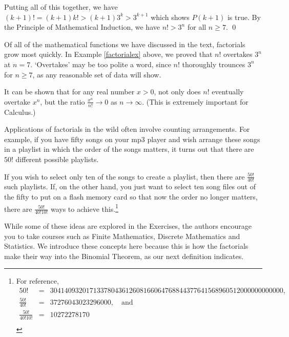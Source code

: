 \documentclass{ximera}
\begin{document}
\begin{example}
\begin{enumerate}
 

Putting all of this together, we have $(k+1)! = (k+1) k! > (k+1)3^{k} > 3^{k+1}$ which shows $P(k+1)$ is true.  By the Principle of Mathematical Induction, we have $n! > 3^{n}$ for all $n \geq 7$. \qed

\end{enumerate}

\end{example} 

Of all of the mathematical functions we have discussed in the text, factorials grow most quickly.  In  Example \ref{factorialex} above, we proved that $n!$ overtakes $3^{n}$ at $n=7$.  `Overtakes' may be too polite a word, since $n!$ thoroughly trounces $3^n$ for $n \geq 7$, as any reasonable set of data will show. 

 

It can be shown that for any real number $x > 0$, not only does $n!$ eventually overtake $x^n$, but the ratio $\frac{x^n}{n!} \rightarrow 0$ as $n \rightarrow \infty$. (This is extremely important for Calculus.)

 

Applications of factorials in the wild often involve counting arrangements. For example, if you have fifty songs on your mp3 player and wish arrange these songs in a playlist in which the order of the songs matters, it turns out that there are $50!$ different possible playlists. 

 

If you wish to select only ten of the songs to create a playlist, then there are $\frac{50!}{40!}$ such playlists.  If, on the other hand, you just want to select ten song files out of the fifty to put on a flash memory card so that now the order no longer matters, there are $\frac{50!}{40! 10!}$ ways to achieve this.\footnote{For reference, \[\begin{array}{ccl} 50! & = &  30414093201713378043612608166064768844377641568960512000000000000, \\  \frac{50!}{40!} & = & 37276043023296000, \quad \text{and} \\   \frac{50!}{40!  10!} & = & 10272278170 \\ \end{array}\]} 

 

 While some of these ideas are explored in the Exercises, the authors encourage you to take courses such as Finite Mathematics, Discrete Mathematics and Statistics. We introduce these concepts here because this is how the factorials make their way into the Binomial Theorem, as our next definition indicates.
\end{document}
